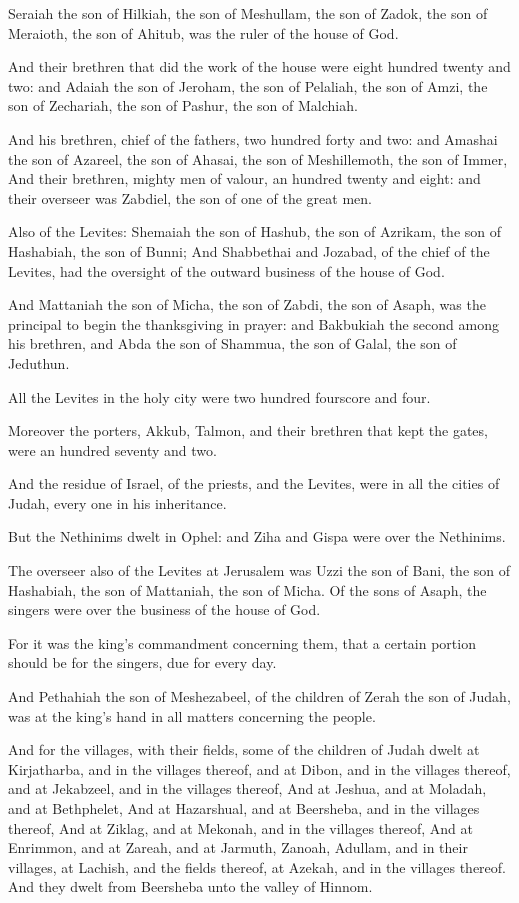 \verse Seraiah the son of Hilkiah, the son of Meshullam, the son of Zadok, the son of Meraioth, the son of Ahitub, was the ruler of the house of God.

\verse And their brethren that did the work of the house were eight hundred twenty and two: and Adaiah the son of Jeroham, the son of Pelaliah, the son of Amzi, the son of Zechariah, the son of Pashur, the son of Malchiah.

\verse And his brethren, chief of the fathers, two hundred forty and two: and Amashai the son of Azareel, the son of Ahasai, the son of Meshillemoth, the son of Immer, \verse And their brethren, mighty men of valour, an hundred twenty and eight: and their overseer was Zabdiel, the son of one of the great men.

\verse Also of the Levites: Shemaiah the son of Hashub, the son of Azrikam, the son of Hashabiah, the son of Bunni; \verse And Shabbethai and Jozabad, of the chief of the Levites, had the oversight of the outward business of the house of God.

\verse And Mattaniah the son of Micha, the son of Zabdi, the son of Asaph, was the principal to begin the thanksgiving in prayer: and Bakbukiah the second among his brethren, and Abda the son of Shammua, the son of Galal, the son of Jeduthun.

\verse All the Levites in the holy city were two hundred fourscore and four.

\verse Moreover the porters, Akkub, Talmon, and their brethren that kept the gates, were an hundred seventy and two.

\verse And the residue of Israel, of the priests, and the Levites, were in all the cities of Judah, every one in his inheritance.

\verse But the Nethinims dwelt in Ophel: and Ziha and Gispa were over the Nethinims.

\verse The overseer also of the Levites at Jerusalem was Uzzi the son of Bani, the son of Hashabiah, the son of Mattaniah, the son of Micha.  Of the sons of Asaph, the singers were over the business of the house of God.

\verse For it was the king's commandment concerning them, that a certain portion should be for the singers, due for every day.

\verse And Pethahiah the son of Meshezabeel, of the children of Zerah the son of Judah, was at the king's hand in all matters concerning the people.

\verse And for the villages, with their fields, some of the children of Judah dwelt at Kirjatharba, and in the villages thereof, and at Dibon, and in the villages thereof, and at Jekabzeel, and in the villages thereof, \verse And at Jeshua, and at Moladah, and at Bethphelet, \verse And at Hazarshual, and at Beersheba, and in the villages thereof, \verse And at Ziklag, and at Mekonah, and in the villages thereof, \verse And at Enrimmon, and at Zareah, and at Jarmuth, \verse Zanoah, Adullam, and in their villages, at Lachish, and the fields thereof, at Azekah, and in the villages thereof. And they dwelt from Beersheba unto the valley of Hinnom.


